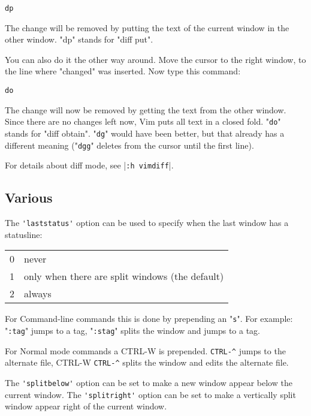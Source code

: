  \begin{Verbatim}[samepage=true]
 dp
 \end{Verbatim}

The change will be removed by putting the text of the current window in the other window.
"dp" stands for "diff put".

You can also do it the other way around.
Move the cursor to the right window, to the line where "changed" was inserted.
Now type this command:

 \begin{Verbatim}[samepage=true]
 do
 \end{Verbatim}

The change will now be removed by getting the text from the other window.
Since there are no changes left now, Vim puts all text in a closed fold.
"\verb!do!" stands for "diff obtain".
"\verb!dg!" would have been better, but that already has a different meaning ("\verb!dgg!" deletes from the cursor until the first line).

For details about diff mode, see |\verb!:h vimdiff!|.
\subsection{Various}
The \verb!'laststatus'! option can be used to specify when the last window has a statusline:

\begin{center}
				\begin{longtable}{c l}
								0 & never\\
								1 & only when there are split windows (the default)\\
								2 & always\\
				\end{longtable}
\end{center}

For Command-line commands this is done by prepending an "\verb!s!".
For example: "\verb!:tag!" jumps to a tag, "\verb!:stag!" splits the window and jumps to a tag.

For Normal mode commands a CTRL-W is prepended.
\verb!CTRL-^! jumps to the alternate file, CTRL-W \verb!CTRL-^! splits the window and edits the alternate file.

The \verb!'splitbelow'! option can be set to make a new window appear below the current window.
The \verb!'splitright'! option can be set to make a vertically split window appear right of the current window.

